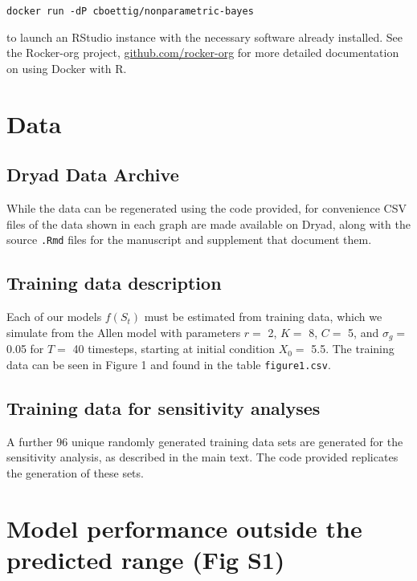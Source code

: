 \documentclass[]{components/elsarticle}
\begin{document}
\begin{verbatim}
docker run -dP cboettig/nonparametric-bayes
\end{verbatim}

to launch an RStudio instance with the necessary software already
installed. See the Rocker-org project,
\href{https://github.com/rocker-org}{github.com/rocker-org} for more
detailed documentation on using Docker with R.

\section{Data}\label{data}

\subsection{Dryad Data Archive}\label{dryad-data-archive}

While the data can be regenerated using the code provided, for
convenience CSV files of the data shown in each graph are made available
on Dryad, along with the source \texttt{.Rmd} files for the manuscript
and supplement that document them.

\subsection{Training data description}\label{training-data-description}

Each of our models $f(S_t)$ must be estimated from training data, which
we simulate from the Allen model with parameters $r = $ 2, $K =$ 8,
$C =$ 5, and $\sigma_g =$ 0.05 for $T=$ 40 timesteps, starting at
initial condition $X_0 = $ 5.5. The training data can be seen in Figure
1 and found in the table \texttt{figure1.csv}.

\subsection{Training data for sensitivity
analyses}\label{training-data-for-sensitivity-analyses}

A further 96 unique randomly generated training data sets are generated
for the sensitivity analysis, as described in the main text. The code
provided replicates the generation of these sets.

\section{Model performance outside the predicted range (Fig
S1)}\label{model-performance-outside-the-predicted-range-fig-s1}
\end{document}
